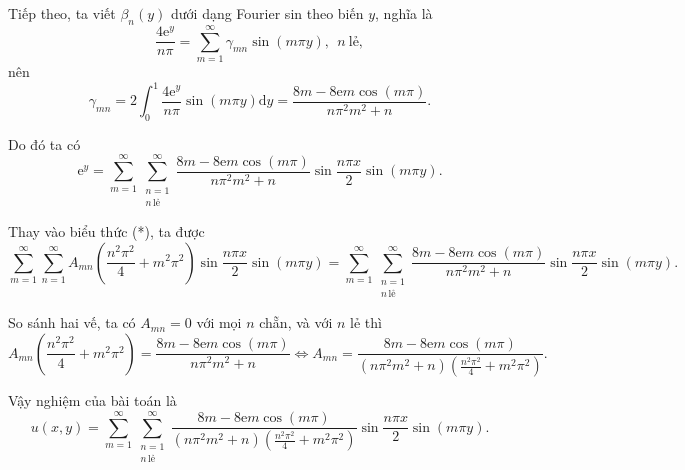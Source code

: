 \documentclass[10pt, a4paper]{article}
\begin{document}
	Tiếp theo, ta viết $\beta_n(y)$ dưới dạng Fourier sin theo biến $y$, nghĩa là $$\dfrac{4\mathrm e^y}{n\pi}=\sum_{m=1}^\infty\gamma_{mn}\sin(m\pi y),~~n~\text{lẻ},$$
	nên $$\gamma_{mn}=2\int_0^1\dfrac{4\mathrm e^y}{n\pi}\sin(m\pi y)\mathrm dy=\frac{8m-8\mathrm em\cos(m\pi)}{n\pi^2m^2+n}.$$
	
	Do đó ta có $$\mathrm e^y=\sum_{m=1}^\infty\sum_{\substack{n=1\\n\,\text{lẻ}}}^\infty\frac{8m-8\mathrm em\cos(m\pi)}{n\pi^2m^2+n}\sin\frac{n\pi x}{2}\sin(m\pi y).$$
	
	Thay vào biểu thức (*), ta được $$\sum_{m=1}^\infty\sum_{n=1}^\infty A_{mn}\left(\frac{n^2\pi^2}{4}+m^2\pi^2\right)\sin\frac{n\pi x}{2}\sin(m\pi y)=\sum_{m=1}^\infty\sum_{\substack{n=1\\n\,\text{lẻ}}}^\infty\frac{8m-8\mathrm em\cos(m\pi)}{n\pi^2m^2+n}\sin\frac{n\pi x}{2}\sin(m\pi y).$$
	
	So sánh hai vế, ta có $A_{mn}=0$ với mọi $n$ chẵn, và với $n$ lẻ thì $$A_{mn}\left(\frac{n^2\pi^2}{4}+m^2\pi^2\right)=\frac{8m-8\mathrm em\cos(m\pi)}{n\pi^2m^2+n}\iff A_{mn}=\frac{8m-8\mathrm em\cos(m\pi)}{(n\pi^2m^2+n)\left(\frac{n^2\pi^2}{4}+m^2\pi^2\right)}.$$
	
	Vậy nghiệm của bài toán là $$u(x,y)=\sum_{m=1}^\infty\sum_{\substack{n=1\\n\,\text{lẻ}}}^\infty\frac{8m-8\mathrm em\cos(m\pi)}{(n\pi^2m^2+n)\left(\frac{n^2\pi^2}{4}+m^2\pi^2\right)}\sin\frac{n\pi x}{2}\sin(m\pi y).$$
\end{document}
